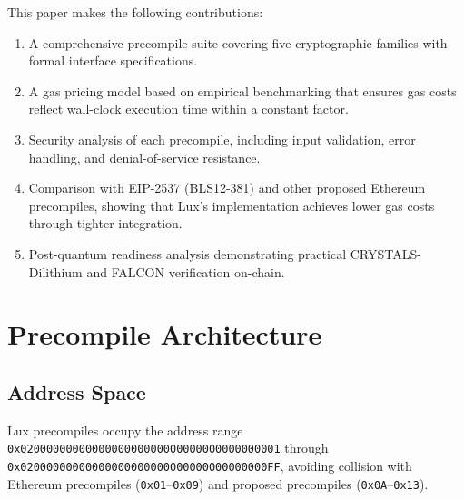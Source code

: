 \documentclass[11pt,a4paper]{article}
\begin{document}
This paper makes the following contributions:

\begin{enumerate}[label=(\roman*)]
    \item A comprehensive precompile suite covering five cryptographic families with formal interface specifications.
    \item A gas pricing model based on empirical benchmarking that ensures gas costs reflect wall-clock execution time within a constant factor.
    \item Security analysis of each precompile, including input validation, error handling, and denial-of-service resistance.
    \item Comparison with EIP-2537 (BLS12-381) and other proposed Ethereum precompiles, showing that Lux's implementation achieves lower gas costs through tighter integration.
    \item Post-quantum readiness analysis demonstrating practical CRYSTALS-Dilithium and FALCON verification on-chain.
\end{enumerate}

\section{Precompile Architecture}\label{sec:architecture}

\subsection{Address Space}

Lux precompiles occupy the address range \texttt{0x0200000000000000000000000000000000000001} through \texttt{0x02000000000000000000000000000000000000FF}, avoiding collision with Ethereum precompiles (\texttt{0x01}--\texttt{0x09}) and proposed precompiles (\texttt{0x0A}--\texttt{0x13}).
\end{document}
